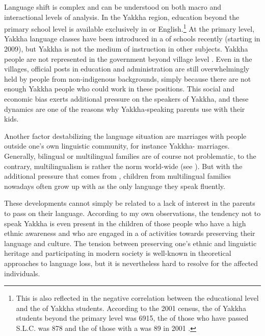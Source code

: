 Language shift is complex and can be understood on both macro and interactional levels of analysis. In the Yakkha region, education beyond the primary school level is available exclusively in  or English.\footnote{This is also reflected in the negative correlation between the educational level and the  of Yakkha students. According to the 2001 census, the  of Yakkha students beyond the primary level was 6915, the  of those who have passed S.L.C. was 878 and the  of those with a  was 89 in 2001 \citep{CBS2001Report}.} At the primary level, Yakkha language classes have been introduced in a  of schools recently (starting in 2009), but Yakkha is not the medium of instruction in other subjects. Yakkha people are not represented in the government beyond village level \citep{CBS2001Report}. Even in the villages, official posts in education and administration are still overwhelmingly held by people from  non-indigenous backgrounds, simply because there are not enough Yakkha people who could work in these positions. This social and economic bias exerts additional pressure on the speakers of Yakkha, and these dynamics are one of the reasons why Yakkha-speaking parents use  with their kids. 


Another factor destabilizing the language situation are marriages with people outside one's  own linguistic community, for instance Yakkha- marriages. Generally, bilingual or multilingual families are of course not problematic, to the contrary, multilingualism is rather the norm world-wide (see \citet{Turin2007_Diversity}). But with the additional pressure that comes from , children from multilingual families nowadays often grow up with  as the only language they speak fluently. 

These developments cannot simply be related to a lack of interest in the parents to pass on their language. According to my own observations, the tendency not to speak Yakkha is even present in the children of those people who have a high ethnic awareness and who are engaged in a  of activities towards preserving their language and culture. The tension between preserving one's  ethnic and linguistic heritage and participating in modern society is well-known in theoretical approaches to language loss, but it is nevertheless hard to resolve for the affected individuals.

